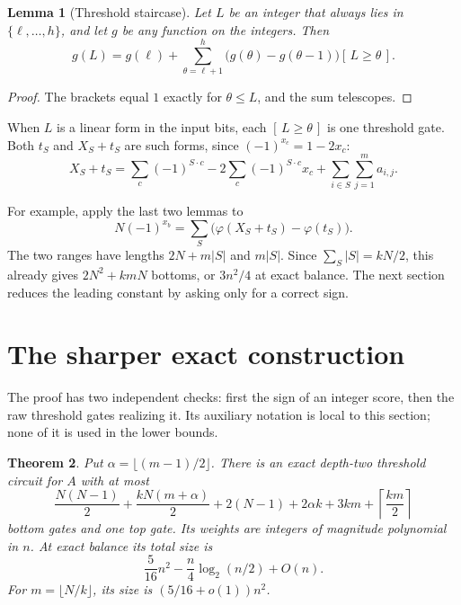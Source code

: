 \documentclass[11pt]{article}
\newtheorem{theorem}{Theorem}[section]
\newtheorem{lemma}[theorem]{Lemma}
\newcommand{\ind}[1]{[\,#1\,]}
\begin{document}
\begin{lemma}[Threshold staircase]\label{lem:ladder}
Let $L$ be an integer that always lies in $\{\ell,\dots,h\}$, and let $g$
be any function on the integers. Then
$$
g(L)=g(\ell)+\sum_{\theta=\ell+1}^{h}\bigl(g(\theta)-g(\theta-1)\bigr)\ind{L\ge\theta}.
$$
\end{lemma}
\begin{proof}
The brackets equal $1$ exactly for $\theta\le L$, and the sum telescopes.
\end{proof}

When $L$ is a linear form in the input bits, each $\ind{L\ge\theta}$ is one
threshold gate. Both $t_S$ and $X_S+t_S$ are such forms, since
$(-1)^{x_c}=1-2x_c$:
\begin{equation}\label{eq:form}
X_S+t_S=\sum_c(-1)^{S\cdot c}-2\sum_c(-1)^{S\cdot c}x_c+\sum_{i\in S}\sum_{j=1}^m a_{i,j}.
\end{equation}


For example, apply the last two lemmas to
$$N(-1)^{x_b}=\sum_S\bigl(\varphi(X_S+t_S)-\varphi(t_S)\bigr).$$
The two ranges have lengths $2N+m|S|$ and $m|S|$. Since
$\sum_S|S|=kN/2$, this already gives $2N^2+kmN$ bottoms, or
$3n^2/4$ at exact balance. The next section reduces the leading
constant by asking only for a correct sign.

\section{The sharper exact construction}\label{sec:exact}
The proof has two independent checks: first the sign of an integer score,
then the raw threshold gates realizing it. Its auxiliary notation is local
to this section; none of it is used in the lower bounds.
\begin{theorem}\label{thm:exact}
Put $\alpha=\lfloor(m-1)/2\rfloor$. There is an exact depth-two threshold
circuit for $A$ with at most
\begin{equation}\label{eq:bestcount}
\frac{N(N-1)}2+\frac{kN(m+\alpha)}2
 +2(N-1)+2\alpha k+3km+\left\lceil\frac{km}{2}\right\rceil
\end{equation}
bottom gates and one top gate. Its weights are integers of magnitude
polynomial in $n$. At exact balance its total size is
$$
\frac5{16}n^2-\frac n4\log_2(n/2)+O(n).
$$
For $m=\lfloor N/k\rfloor$, its size is $(5/16+o(1))n^2$.
\end{theorem}
\end{document}
